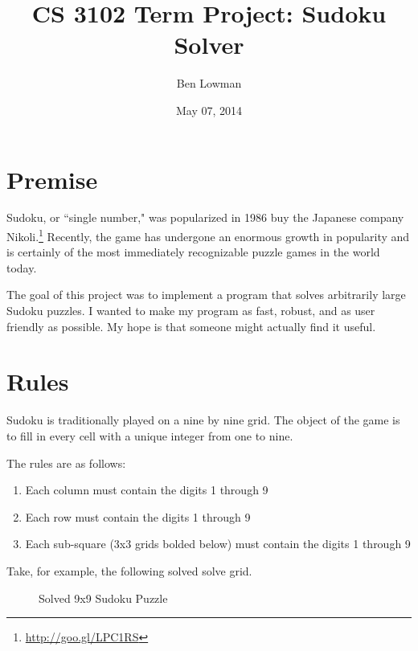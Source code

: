 \documentclass{article}
\title{CS 3102 Term Project: Sudoku Solver}
\author{Ben Lowman}
\date{ May 07, 2014}
\begin{document}
\maketitle

\section*{Premise}

Sudoku, or ``single number," was popularized in 1986 buy the Japanese company Nikoli.\footnote{\url{http://goo.gl/LPC1RS}} Recently, the game has undergone an enormous growth in popularity and is certainly of the most immediately recognizable puzzle games in the world today.

The goal of this project was to implement a program that solves arbitrarily large Sudoku puzzles. I wanted to make my program as fast, robust, and as user friendly as possible. My hope is that someone might actually find it useful.
	
\section*{Rules}


Sudoku is traditionally played on a nine by nine grid. The object of the game is to fill in every cell with a unique integer from one to  nine. 

The rules are as follows: 

\begin{enumerate}[leftmargin=3cm]
	\item Each column must contain the digits 1 through 9
	\item Each row must contain the digits 1 through 9
	\item Each sub-square (3x3 grids bolded below) must contain the digits 1 through 9
\end{enumerate}

Take, for example, the following solved solve grid.

\begin{figure}[h!]
\begin{center}
	\caption{Solved 9x9 Sudoku Puzzle}
\end{center}
\end{figure}
\end{document}
